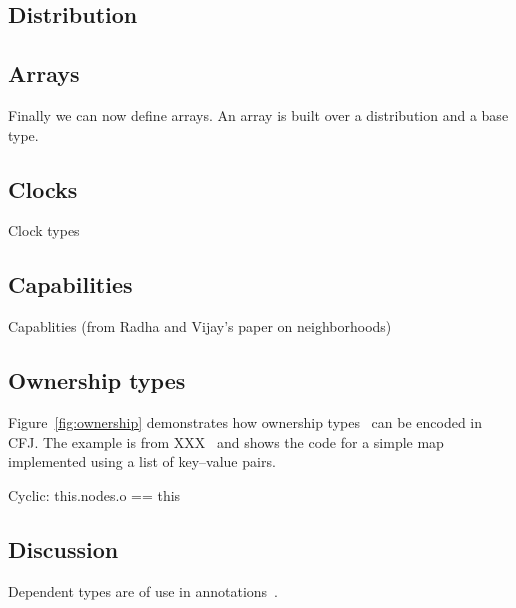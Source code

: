 \subsection{Distribution}


% 

\subsection{Arrays}

\cite{gps06-arrays}

Finally we can now define arrays. An array is built over a
distribution and a base type.

%

\subsection{Clocks}

Clock types

\subsection{Capabilities}

Capablities (from Radha and Vijay's paper on neighborhoods)

\subsection{Ownership types}

Figure~\ref{fig:ownership} demonstrates how ownership
types~\cite{ownership-types} can be encoded in CFJ.
The example is from XXX~\cite{???} and shows the code for a
simple map implemented using a list of key--value pairs.

Cyclic: this.nodes.o == this

\begin{figure*}

\caption{Ownership types}
\label{fig:ownership}
\end{figure*}

\subsection{Discussion}

Dependent types are of use in annotations~\cite{ns07-x10anno}.
